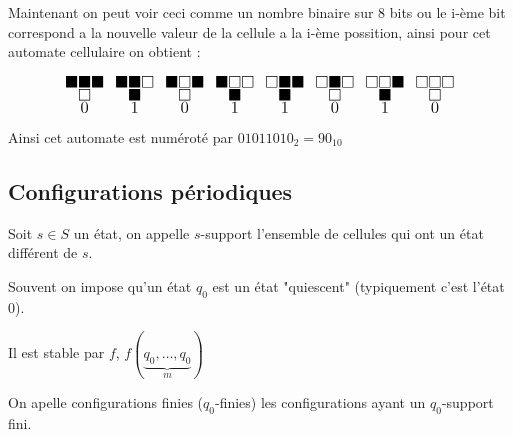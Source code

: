 \begin{notation}
	Maintenant on peut voir ceci comme un nombre binaire sur 8 bits ou le i-ème bit correspond a la
	nouvelle valeur de la cellule a la i-ème possition, ainsi pour cet automate cellulaire on obtient :


	\[ \LARGE
		\substack{\blacksquare \blacksquare \blacksquare \\ \square \\ 0 } \enspace
		\substack{\blacksquare \blacksquare \square \\ \blacksquare \\ 1} \enspace
		\substack{\blacksquare \square \blacksquare \\ \square \\ 0} \enspace
		\substack{\blacksquare \square \square \\ \blacksquare \\ 1} \enspace
		\substack{\square \blacksquare \blacksquare \\ \blacksquare \\ 1} \enspace
		\substack{\square \blacksquare \square \\ \square \\ 0} \enspace
		\substack{\square \square \blacksquare \\ \blacksquare \\ 1} \enspace
		\substack{\square \square \square \\ \square \\ 0}
	\]

	Ainsi cet automate est numéroté par $01011010_2 = 90_{10}$
\end{notation}

\subsection{Configurations périodiques}

\begin{definition}
	Soit $s \in S$ un état, on appelle $s$-support l'ensemble de cellules qui ont
	un état différent de $s$.
\end{definition}

\begin{notation}
	Souvent on impose qu'un état $q_0$ est un état "quiescent" (typiquement c'est l'état 0).

	Il est stable par $f$, \ie $f(\underbrace{q_0,\ldots, q_0}_m)$
\end{notation}

\begin{definition}
	On apelle configurations finies ($q_0$-finies) les configurations ayant un $q_0$-support fini.
\end{definition}

